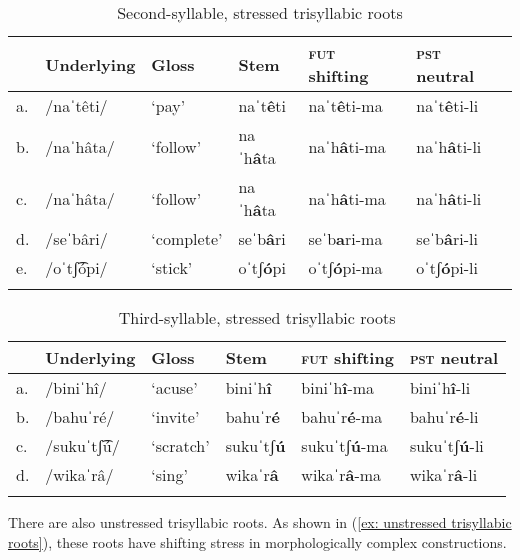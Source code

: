 \begin{table}
\caption{Second-syllable, stressed trisyllabic roots}
\label{tab:second-syllable-trisyllabic}

\begin{tabularx}{\textwidth}{lXXXXl}
\lsptoprule
&\textbf{Underlying} & \textbf{Gloss} & \textbf{Stem} & \textbf{\textsc{fut} shifting} & \textbf{\textsc{pst} neutral} \\
\midrule
a.& /naˈtêti/  &   ‘pay’   & naˈt\textbf{ê}ti  &  naˈt\textbf{ê}ti-ma  & naˈt\textbf{ê}ti-li\\
b.&  /naˈhâta/  & ‘follow’  & naˈh\textbf{â}ta &   naˈh\textbf{â}ti-ma & naˈh\textbf{â}ti-li\\
c.& /naˈhâta/ & ‘follow’ & naˈh\textbf{â}ta    & naˈh\textbf{â}ti-ma  & naˈh\textbf{â}ti-li\\
d.&  /seˈbâri/ &   ‘complete’  & seˈb\textbf{â}ri  &  seˈb\textbf{a}ri-ma  & seˈb\textbf{â}ri-li\\
e.& /oˈtʃ͡ópi/  &  ‘stick' &  oˈtʃ\textbf{ó}pi &    oˈtʃ\textbf{ó}pi-ma & oˈtʃ\textbf{ó}pi-li \\
\lspbottomrule
\end{tabularx}
\end{table}

\begin{table}
\caption{Third-syllable, stressed trisyllabic roots}
\label{tab:third-syllable-trisyllabic}

\begin{tabularx}{\textwidth}{lXXXXl}
\lsptoprule
&\textbf{Underlying} & \textbf{Gloss} & \textbf{Stem} & \textbf{\textsc{fut} shifting} & \textbf{\textsc{pst} neutral} \\
\midrule
a.& /biniˈhî/  &  ‘acuse’  & biniˈh\textbf{î}    & biniˈh\textbf{î}{}-ma  & biniˈh\textbf{î}{}-li\\
b.&  /bahuˈré/  &  ‘invite’   & bahuˈr\textbf{é}  &  bahuˈr\textbf{é}{}-ma  & bahuˈr\textbf{é}{}-li\\
c.&  /sukuˈtʃ͡ú/ &   ‘scratch' &  sukuˈtʃ\textbf{ú} &  sukuˈtʃ\textbf{ú}{}-ma & sukuˈtʃ\textbf{ú}{}-li\\
d.&  /wikaˈrâ/    & ‘sing’   & wikaˈr\textbf{â}  & wikaˈr\textbf{â}{}-ma  & wikaˈr\textbf{â}{}-li\\
\lspbottomrule
\end{tabularx}
\end{table}

There are also unstressed trisyllabic roots. As shown in (\ref{ex: unstressed trisyllabic roots}), these roots have shifting stress in morphologically complex constructions.

